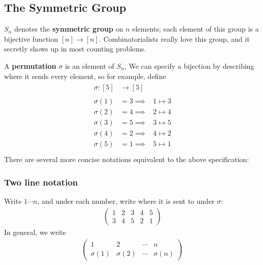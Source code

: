 \hypertarget{the-symmetric-group}{%
\subsection{The Symmetric Group}\label{the-symmetric-group}}

\(S_n\) denotes the \textbf{symmetric group} on \(n\) elements; each
element of this group is a bijective function \([n]\to[n]\).
Combinatorialists really love this group, and it secretly shows up in
most counting problems.

A \textbf{permutation} \(\sigma\) is an element of \(S_n\), We can
specify a bijection by describing where it sends every element, so for
example, define
\begin{align*}\begin{aligned}
\sigma: [5] &\to [5] &\\ \\
\sigma(1) &= 3 \implies &1 \mapsto 3 \\
\sigma(2) &= 4 \implies &2 \mapsto 4 \\
\sigma(3) &= 5 \implies &3 \mapsto 5 \\
\sigma(4) &= 2 \implies &4 \mapsto 2 \\
\sigma(5) &= 1 \implies &5 \mapsto 1 \\
\end{aligned}\end{align*} There are several more concise notations
equivalent to the above specification:

\hypertarget{two-line-notation}{%
\subsubsection{Two line notation}\label{two-line-notation}}

Write \(1\cdots n\), and under each number, write where it is sent to
under \(\sigma\):
\begin{align*}
\left( \begin{array}{ccccc}
1 & 2 & 3 & 4 & 5 \\
3 & 4 & 5 & 2 & 1
\end{array}\right)
\end{align*} In general, we write
\begin{align*}
\left( \begin{array}{cccc}
1 & 2 & \cdots & n  \\
\sigma(1) & \sigma(2) & \cdots & \sigma(n)
\end{array}\right)
\end{align*}

